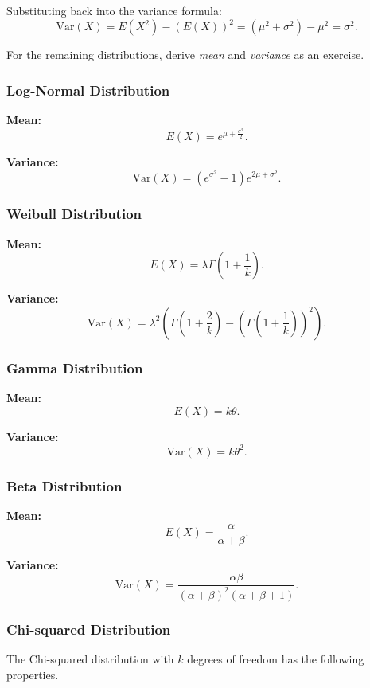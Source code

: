 Substituting back into the variance formula:
\[
\text{Var}(X) = E(X^2) - (E(X))^2 = \left(\mu^2 + \sigma^2\right) - \mu^2 = \sigma^2.
\]

For the remaining distributions, derive \textit{mean} and \textit{variance} as an exercise. 

\subsubsection{Log-Normal Distribution}

\textbf{Mean:}
\[
E(X) = e^{\mu + \frac{\sigma^2}{2}}.
\]

\textbf{Variance:}
\[
\text{Var}(X) = (e^{\sigma^2} - 1)e^{2\mu + \sigma^2}.
\]

\subsubsection{Weibull Distribution}

\textbf{Mean:}
\[
E(X) = \lambda \Gamma\left(1 + \frac{1}{k}\right).
\]

\textbf{Variance:}
\[
\text{Var}(X) = \lambda^2 \left( \Gamma\left(1 + \frac{2}{k}\right) - \left( \Gamma\left(1 + \frac{1}{k}\right) \right)^2 \right).
\]

\subsubsection{Gamma Distribution}

\textbf{Mean:}
\[
E(X) = k\theta.
\]

\textbf{Variance:}
\[
\text{Var}(X) = k\theta^2.
\]

\subsubsection{Beta Distribution}

\textbf{Mean:}
\[
E(X) = \frac{\alpha}{\alpha + \beta}.
\]

\textbf{Variance:}
\[
\text{Var}(X) = \frac{\alpha\beta}{(\alpha + \beta)^2(\alpha + \beta + 1)}.
\]

\subsubsection{Chi-squared Distribution}

The Chi-squared distribution with \( k \) degrees of freedom has the following properties.\\


